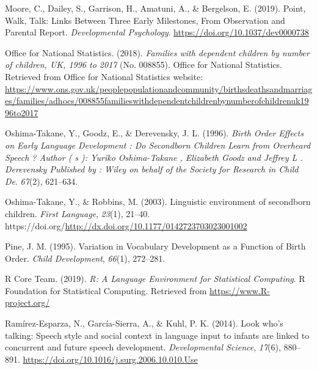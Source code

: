 \documentclass[
  english,
  man,floatsintext]{apa6}
\newlength{\cslhangindent}
\newlength{\cslentryspacingunit} %
\newenvironment{CSLReferences}[2] %
 {%
  \setlength{\parindent}{0pt}
  \ifodd #1
  \let\oldpar\par
  \def\par{\hangindent=\cslhangindent\oldpar}
  \fi
  \setlength{\parskip}{#2\cslentryspacingunit}
 }%
 {}
\begin{document}
\begin{CSLReferences}{1}{0}
\leavevmode{}%
Moore, C., Dailey, S., Garrison, H., Amatuni, A., \& Bergelson, E. (2019). Point, {Walk}, {Talk}: {Links} {Between} {Three} {Early} {Milestones}, {From} {Observation} and {Parental} {Report}. \emph{Developmental Psychology}. \url{https://doi.org/10.1037/dev0000738}

\leavevmode{}%
Office for National Statistics. (2018). \emph{Families with dependent children by number of children, {UK}, 1996 to 2017} (No. 008855). Office for National Statistics. Retrieved from Office for National Statistics website: \url{https://www.ons.gov.uk/peoplepopulationandcommunity/birthsdeathsandmarriages/families/adhocs/008855familieswithdependentchildrenbynumberofchildrenuk1996to2017}

\leavevmode{}%
Oshima-Takane, Y., Goodz, E., \& Derevensky, J. L. (1996). \emph{Birth {Order} {Effects} on {Early} {Language} {Development} : {Do} {Secondborn} {Children} {Learn} from {Overheard} {Speech} ? {Author} ( s ): {Yuriko} {Oshima}-{Takane} , {Elizabeth} {Goodz} and {Jeffrey} {L} . {Derevensky} {Published} by : {Wiley} on behalf of the {Society} for {Research} in {Child} {De}}. \emph{67}(2), 621--634.

\leavevmode{}%
Oshima-Takane, Y., \& Robbins, M. (2003). Linguistic environment of secondborn children. \emph{First Language}, \emph{23}(1), 21--40. https://doi.org/\url{http://dx.doi.org/10.1177/0142723703023001002}

\leavevmode{}%
Pine, J. M. (1995). Variation in {Vocabulary} {Development} as a {Function} of {Birth} {Order}. \emph{Child Development}, \emph{66}(1), 272--281.

\leavevmode{}%
R Core Team. (2019). \emph{R: {A} {Language} {Environment} for {Statistical} {Computing}}. R Foundation for Statistical Computing. Retrieved from \url{https://www.R-project.org/}

\leavevmode{}%
Ramírez-Esparza, N., García-Sierra, A., \& Kuhl, P. K. (2014). Look who's talking: Speech style and social context in language input to infants are linked to concurrent and future speech development. \emph{Developmental Science}, \emph{17}(6), 880--891. \url{https://doi.org/10.1016/j.surg.2006.10.010.Use}


\end{CSLReferences}
\end{document}
